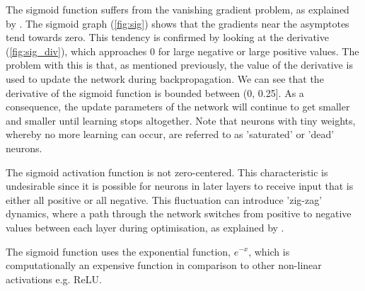             The sigmoid function suffers from the vanishing gradient problem, as explained by \cite{activation_funcA}. The sigmoid graph (\ref{fig:sig}) shows that the gradients near the asymptotes tend towards zero. This tendency is confirmed by looking at the derivative (\ref{fig:sig_div}), which approaches 0 for large negative or large positive values. The problem with this is that, as mentioned previously, the value of the derivative is used to update the network during backpropagation. We can see that the derivative of the sigmoid function is bounded between (0, 0.25]. As a consequence, the update parameters of the network will continue to get smaller and smaller until learning stops altogether. Note that neurons with tiny weights, whereby no more learning can occur, are referred to as 'saturated' or 'dead' neurons.

            The sigmoid activation function is not zero-centered. This characteristic is undesirable since it is possible for neurons in later layers to receive input that is either all positive or all negative. This fluctuation can introduce 'zig-zag' dynamics, where a path through the network switches from positive to negative values between each layer during optimisation, as explained by \cite{activation_funcA}. 
            
            The sigmoid function uses the exponential function, $e^{-x}$, which is computationally an expensive function in comparison to other non-linear activations e.g. ReLU. 
            
            
